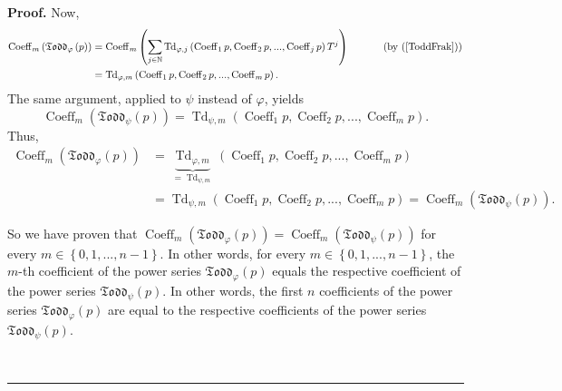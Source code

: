 \documentclass[numbers=enddot,12pt,final,onecolumn,notitlepage]{scrartcl}%
\newenvironment{proof}[1][Proof]{\noindent\textbf{#1.} }{\ \rule{0.5em}{0.5em}}
\begin{document}
\begin{proof}
Now,%
\begin{align*}
\operatorname*{Coeff}\nolimits_{m}\left(  \mathfrak{Todd}_{\varphi}\left(
p\right)  \right)   &  =\operatorname*{Coeff}\nolimits_{m}\left(
\sum\limits_{j\in\mathbb{N}}\operatorname*{Td}\nolimits_{\varphi,j}\left(
\operatorname*{Coeff}\nolimits_{1}p,\operatorname*{Coeff}\nolimits_{2}%
p,...,\operatorname*{Coeff}\nolimits_{j}p\right)  T^{j}\right)
\ \ \ \ \ \ \ \ \ \ \left(  \text{by (\ref{ToddFrak})}\right) \\
&  =\operatorname*{Td}\nolimits_{\varphi,m}\left(  \operatorname*{Coeff}%
\nolimits_{1}p,\operatorname*{Coeff}\nolimits_{2}p,...,\operatorname*{Coeff}%
\nolimits_{m}p\right)  .
\end{align*}
The same argument, applied to $\psi$ instead of $\varphi$, yields%
\[
\operatorname*{Coeff}\nolimits_{m}\left(  \mathfrak{Todd}_{\psi}\left(
p\right)  \right)  =\operatorname*{Td}\nolimits_{\psi,m}\left(
\operatorname*{Coeff}\nolimits_{1}p,\operatorname*{Coeff}\nolimits_{2}%
p,...,\operatorname*{Coeff}\nolimits_{m}p\right)  .
\]
Thus,%
\begin{align*}
\operatorname*{Coeff}\nolimits_{m}\left(  \mathfrak{Todd}_{\varphi}\left(
p\right)  \right)   &  =\underbrace{\operatorname*{Td}\nolimits_{\varphi,m}%
}_{=\operatorname*{Td}\nolimits_{\psi,m}}\left(  \operatorname*{Coeff}%
\nolimits_{1}p,\operatorname*{Coeff}\nolimits_{2}p,...,\operatorname*{Coeff}%
\nolimits_{m}p\right) \\
&  =\operatorname*{Td}\nolimits_{\psi,m}\left(  \operatorname*{Coeff}%
\nolimits_{1}p,\operatorname*{Coeff}\nolimits_{2}p,...,\operatorname*{Coeff}%
\nolimits_{m}p\right)  =\operatorname*{Coeff}\nolimits_{m}\left(
\mathfrak{Todd}_{\psi}\left(  p\right)  \right)  .
\end{align*}


So we have proven that $\operatorname*{Coeff}\nolimits_{m}\left(
\mathfrak{Todd}_{\varphi}\left(  p\right)  \right)  =\operatorname*{Coeff}%
\nolimits_{m}\left(  \mathfrak{Todd}_{\psi}\left(  p\right)  \right)  $ for
every $m\in\left\{  0,1,...,n-1\right\}  $. In other words, for every
$m\in\left\{  0,1,...,n-1\right\}  $, the $m$-th coefficient of the power
series $\mathfrak{Todd}_{\varphi}\left(  p\right)  $ equals the respective
coefficient of the power series $\mathfrak{Todd}_{\psi}\left(  p\right)  $. In
other words, the first $n$ coefficients of the power series $\mathfrak{Todd}%
_{\varphi}\left(  p\right)  $ are equal to the respective coefficients of the
power series $\mathfrak{Todd}_{\psi}\left(  p\right)  $.


\end{proof}
\end{document}
